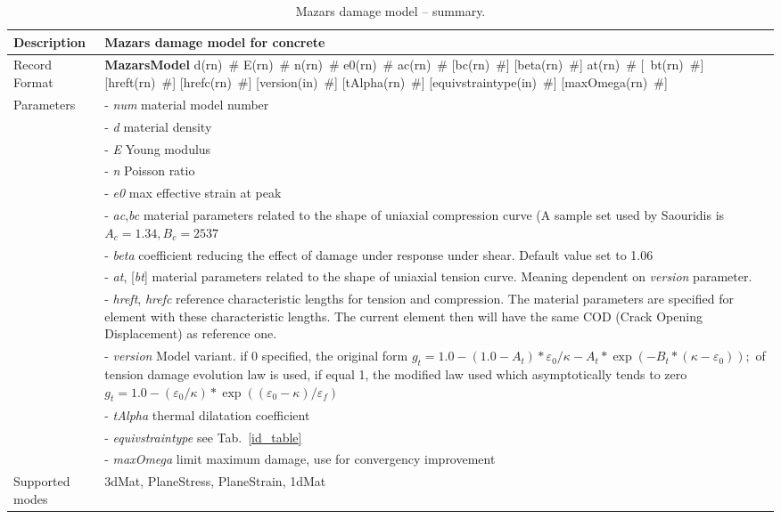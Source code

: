 \documentclass[a4paper]{article}
\newcommand{\descitem}[1]{{\noindent \bf #1}}
\newcommand{\elemparam}[2]{{{#1\tiny (#2)}~\#}}
\newcommand{\optelemparam}[2]{[{~\elemparam{#1}{#2}}]}
\newcommand{\param}[1]{{\it #1}}
\newcommand{\optparam}[1]{[{\it #1}]}
\newenvironment{mmt}{\begin{tabular}{|l|p{9cm}|}}{\end{tabular}\\}
\newenvironment{mmt}{\begin{tabular}{|l|l|}}{\end{tabular}\\}
\begin{document}
\begin{table}[!htb]
\begin{mmt}
\hline
Description & Mazars damage model for concrete\\
\hline
Record Format & \descitem{MazarsModel} \elemparam{d}{rn} \elemparam{E}{rn}
\elemparam{n}{rn}  \elemparam{e0}{rn}
\elemparam{ac}{rn} [\elemparam{bc}{rn}] [\elemparam{beta}{rn}]
\elemparam{at}{rn} \optelemparam{bt}{rn}
[\elemparam{hreft}{rn}] [\elemparam{hrefc}{rn}]
[\elemparam{version}{in}] [\elemparam{tAlpha}{rn}] [\elemparam{equivstraintype}{in}]
[\elemparam{maxOmega}{rn}]\\
Parameters &- \param{num} material model number\\
&- \param{d} material density\\
&- \param{E} Young modulus\\
&- \param{n} Poisson ratio\\
&- \param{e0} max effective strain at peak\\
&- \param{ac},\param{bc} material parameters related to the shape of
uniaxial compression curve (A sample set used by Saouridis is $A_c =
1.34, B_c = 2537$\\
&- \param{beta} coefficient reducing the effect of damage under
response under shear. Default value set to 1.06\\
&- \param{at}, \optparam{bt} material parameters related to the shape of
uniaxial tension curve. Meaning dependent on \param{version}
parameter.\\
&- \param{hreft}, \param{hrefc} reference characteristic lengths for
tension and compression. The material parameters are specified for
element with these characteristic lengths. The current element then
will have the same COD (Crack Opening Displacement) as reference one.\\
&- \param{version} Model variant. if 0 specified, the original form
$g_t= 1.0-(1.0-A_t)*\varepsilon_0/\kappa - A_t*\exp(-B_t*(\kappa-\varepsilon_0));
$ of
tension damage evolution law is used, if equal 1, the modified law
used which asymptotically tends to zero
$g_t = 1.0-(\varepsilon_0/\kappa)*\exp((\varepsilon_0-\kappa)/\varepsilon_f)$\\
&- \param{tAlpha} thermal dilatation coefficient\\
&- \param{equivstraintype} see Tab.~\ref{id_table}\\
&- \param{maxOmega} limit maximum damage, use for convergency improvement\\
Supported modes& 3dMat, PlaneStress, PlaneStrain, 1dMat\\
\hline
\end{mmt}
\caption{Mazars damage model  -- summary.}
\label{maz_table}
\end{table}
\end{document}
